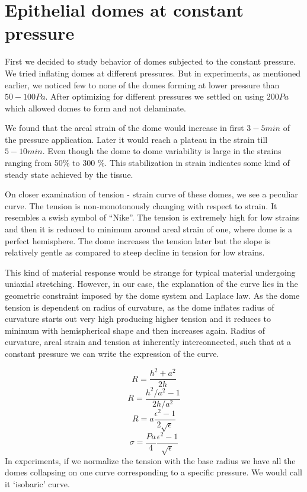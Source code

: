 \hypertarget{epithelial-domes-at-constant-pressure}{%
\section{Epithelial domes at constant
pressure}\label{epithelial-domes-at-constant-pressure}}

First we decided to study behavior of domes subjected to the constant
pressure. We tried inflating domes at different pressures. But in
experiments, as mentioned earlier, we noticed few to none of the domes
forming at lower pressure than \(50-100 Pa\). After optimizing for
different pressures we settled on using \(200Pa\) which allowed domes to
form and not delaminate.

We found that the areal strain of the dome would increase in first
\(3-5min\) of the pressure application. Later it would reach a plateau
in the strain till \(5-10 min\). Even though the dome to dome
variability is large in the strains ranging from 50\% to 300 \%. This
stabilization in strain indicates some kind of steady state achieved by
the tissue.

On closer examination of tension - strain curve of these domes, we see a
peculiar curve. The tension is non-monotonously changing with respect to
strain. It resembles a swish symbol of ``Nike''. The tension is
extremely high for low strains and then it is reduced to minimum around
areal strain of one, where dome is a perfect hemisphere. The dome
increases the tension later but the slope is relatively gentle as
compared to steep decline in tension for low strains.

This kind of material response would be strange for typical material
undergoing uniaxial stretching. However, in our case, the explanation of
the curve lies in the geometric constraint imposed by the dome system
and Laplace law. As the dome tension is dependent on radius of
curvature, as the dome inflates radius of curvature starts out very high
producing higher tension and it reduces to minimum with hemispherical
shape and then increases again. Radius of curvature, areal strain and
tension at inherently interconnected, such that at a constant pressure
we can write the expression of the curve.

\[ R = \frac{h^2 + a^2}{2h} \] \[ R = \frac{h^2/a^2 - 1}{2h/a^2} \]
\[ R = a\frac{\epsilon^2 - 1}{2\sqrt{\epsilon}} \]
\[ \sigma = \frac{Pa}{4} \frac{\epsilon^2 - 1}{\sqrt{\epsilon}}\] In
experiments, if we normalize the tension with the base radius we have
all the domes collapsing on one curve corresponding to a specific
pressure. We would call it `isobaric' curve.

